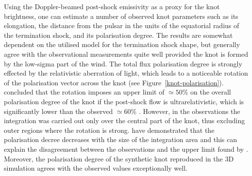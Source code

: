 Using the Doppler-beamed post-shock emissivity as a proxy for the knot brightness, one can estimate a number of observed  knot parameters such as its elongation, the distance from the pulsar in the units of the equatorial radius of the termination shock, and its polarisation degree.     The results are somewhat dependent on the  utilised model for the termination shock shape, but generally agree with the observational measurements quite well provided the knot is formed by the low-sigma part of the wind.  
The total flux polarisation degree is strongly effected by the relativistic aberration of light, which leads to a noticeable rotation of the polarisation vector across the knot (see Figure~\ref{knot-polarisation}).  \citet{YB-15} concluded that the rotation imposes an upper limit 
of $\simeq 50\%$ on the overall polarisation degree of the knot if the post-shock flow is ultrarelativistic, which is significantly lower than the observed $\simeq 60\%$ .  However, in the observations the integration was carried out only over the central part of the knot, thus excluding outer regions where the rotation is strong. \citet{LKP-16} have demonstrated that the polarisation decree decreases with the size of the integration area and this can explain the disagreement  between the observations and the upper limit found by \citet{YB-15}.      
Moreover, the polarisation degree of the synthetic knot reproduced in the 3D simulation \citep{porth-14} agrees with the observed values exceptionally well. 